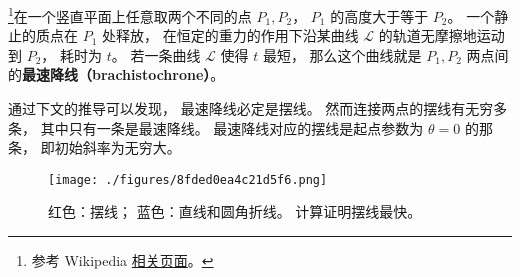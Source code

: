 

\footnote{参考 Wikipedia \href{https://en.wikipedia.org/wiki/Brachistochrone_curve}{相关页面}。}在一个竖直平面上任意取两个不同的点 $P_1, P_2$， $P_1$ 的高度大于等于 $P_2$。 一个静止的质点在 $P_1$ 处释放， 在恒定的重力的作用下沿某曲线 $\mathcal L$ 的轨道无摩擦地运动到 $P_2$， 耗时为 $t$。 若一条曲线 $\mathcal L$ 使得 $t$ 最短， 那么这个曲线就是 $P_1, P_2$ 两点间的\textbf{最速降线（brachistochrone）}。

通过下文的推导可以发现， 最速降线必定是摆线。 然而连接两点的摆线有无穷多条， 其中只有一条是最速降线。 最速降线对应的摆线是起点参数为 $\theta = 0$ 的那条， 即初始斜率为无穷大。

\begin{figure}[ht]
\centering
\texttt{[image: ./figures/8fded0ea4c21d5f6.png]}
\caption{红色：摆线； 蓝色：直线和圆角折线。 计算证明摆线最快。} \label{fig_Brachi_1}
\end{figure}

